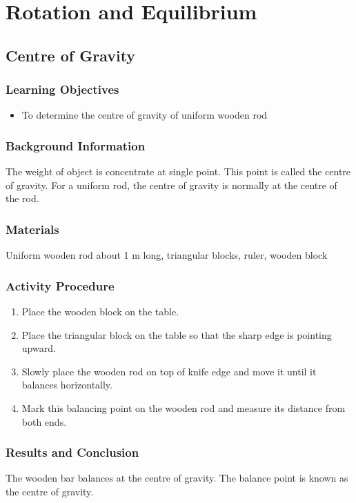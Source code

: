 \section{Rotation and Equilibrium}

\subsection{Centre of Gravity}

\subsubsection*{Learning Objectives}
\begin{itemize}
\item{To determine the centre of gravity of uniform wooden rod} 
\end{itemize}

\subsubsection*{Background Information}
The weight of object is concentrate at single point. This point is called the centre of gravity. For a uniform rod, the centre of gravity is normally at the centre of the rod.  

\subsubsection*{Materials}
Uniform wooden rod about 1 m long, triangular blocks, ruler, wooden block

\subsubsection*{Activity Procedure}
\begin{enumerate}
\item{Place the wooden block on the table.} 
\item{Place the triangular block on the table so that the sharp edge is pointing upward.} 
\item{Slowly place the wooden rod on top of knife edge and move it until it balances horizontally.} 
\item{Mark this balancing point on the wooden rod and measure its distance from both ends.} 
\end{enumerate}

\subsubsection*{Results and Conclusion}
The wooden bar balances at the centre of gravity. The balance point is known as the centre of gravity.  

